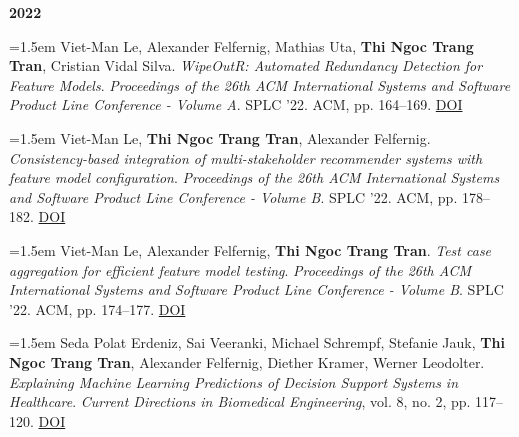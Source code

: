 \documentclass[11pt,a4paper]{article}
\newcommand{\pub}[1]{%
  \par\noindent\hangindent=1.5em\hangafter=1 #1\par\vspace{0.5ex}}
\newcommand{\pubyear}[1]{\vspace{0.7ex}\par\noindent\textbf{#1}\par\vspace{0.2ex}}
\begin{document}
\pubyear{2022}
\pub{Viet-Man Le, Alexander Felfernig, Mathias Uta, \textbf{Thi Ngoc Trang Tran}, Cristian Vidal Silva. \textit{WipeOutR: Automated Redundancy Detection for Feature Models}. \textit{Proceedings of the 26th ACM International Systems and Software Product Line Conference - Volume A}. SPLC ’22. ACM, pp. 164–169. \href{https://doi.org/10.1145/3546932.3546992}{DOI}}
\pub{Viet-Man Le, \textbf{Thi Ngoc Trang Tran}, Alexander Felfernig. \textit{Consistency-based integration of multi-stakeholder recommender systems with feature model configuration}. \textit{Proceedings of the 26th ACM International Systems and Software Product Line Conference - Volume B}. SPLC ’22. ACM, pp. 178–182. \href{https://doi.org/10.1145/3503229.3547050}{DOI}}
\pub{Viet-Man Le, Alexander Felfernig, \textbf{Thi Ngoc Trang Tran}. \textit{Test case aggregation for efficient feature model testing}. \textit{Proceedings of the 26th ACM International Systems and Software Product Line Conference - Volume B}. SPLC ’22. ACM, pp. 174–177. \href{https://doi.org/10.1145/3503229.3547046}{DOI}}
\pub{Seda Polat Erdeniz, Sai Veeranki, Michael Schrempf, Stefanie Jauk, \textbf{Thi Ngoc Trang Tran}, Alexander Felfernig, Diether Kramer, Werner Leodolter. \textit{Explaining Machine Learning Predictions of Decision Support Systems in Healthcare}. \textit{Current Directions in Biomedical Engineering}, vol. 8, no. 2, pp. 117–120. \href{https://doi.org/10.1515/cdbme-2022-1031}{DOI}}
\end{document}
